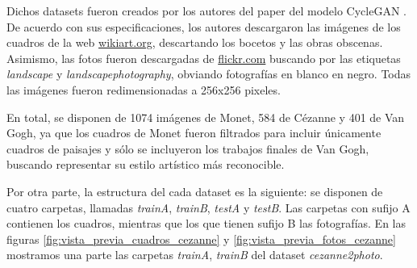 \documentclass[../main.tex]{subfiles}
\begin{document}
Dichos datasets fueron creados por los autores del paper del modelo CycleGAN \cite{Zhu2017}. De acuerdo con sus especificaciones, los autores descargaron las imágenes de los cuadros de la web \url{wikiart.org}, descartando los bocetos y las obras obscenas. Asimismo, las fotos fueron descargadas de \url{flickr.com} buscando por las etiquetas \textit{landscape} y \textit{landscapephotography}, obviando fotografías en blanco en negro. Todas las imágenes fueron redimensionadas a 256x256 pixeles. \newline

En total, se disponen de 1074 imágenes de Monet, 584 de Cézanne y 401 de Van Gogh, ya que los cuadros de Monet fueron filtrados para incluir únicamente cuadros de paisajes y sólo se incluyeron los trabajos finales de Van Gogh, buscando representar su estilo artístico más reconocible. \newline

Por otra parte, la estructura del cada dataset es la siguiente: se disponen de cuatro carpetas, llamadas \textit{trainA}, \textit{trainB}, \textit{testA} y \textit{testB}. Las carpetas con sufijo A contienen los cuadros, mientras que los que tienen sufijo B las fotografías. En las figuras \ref{fig:vista_previa_cuadros_cezanne} y \ref{fig:vista_previa_fotos_cezanne} mostramos una parte las carpetas \textit{trainA}, \textit{trainB} del dataset \textit{cezanne2photo}.
\end{document}
